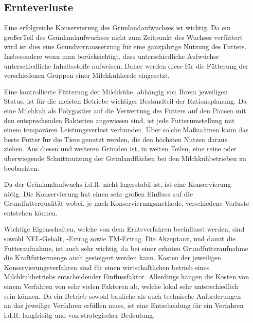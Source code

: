 \subsection{Ernteverluste}
\label{subsec:Lit:Ernte}

Eine erfolgreiche Konservierung des Grünlandaufwuchses ist wichtig.
Da ein großerTeil des Grünlandaufwuchses nicht zum Zeitpunkt des Wuchses verfüttert wird ist dies eine Grundvorraussetzung für eine ganzjährige Nutzung des Futters.
Insbesondere wenn man berücksichtigt, dass unterschiedliche Aufwüchse unterschiedliche Inhaltsstoffe aufweisen.
Daher werden diese für die Fütterung der verschiedenen Gruppen einer Milchkuhherde eingesetzt. 

Eine kontrollierte Fütterung der Milchkühe, abhängig von Ihrem jeweiligen Status, ist für die meisten Betriebe wichtiger Bestandteil der Rationsplanung. 
Da eine Milchkuh als Polygastier auf die Verwertung des Futters auf den Pansen mit den entsprechenden Bakterien angewiesen sind, ist jede Futterumstellung mit einem temporären Leistungsverlust verbunden. 
Über solche Maßnahmen kann das beste Futter für die Tiere genutzt werden, die den höchsten Nutzen daraus ziehen.
Aus diesen und weiteren Gründen ist, in weiten Teilen, eine reine oder überwiegende Schnittnutzung der Grünlandflächen bei den Milchkuhbetrieben zu beobachten.

Da der Grünlandaufwuchs i.d.R. nicht lagerstabil ist, ist eine Konservierung nötig.
Die Konservierung hat einen sehr großen Einfluss auf die Grundfutterqualität wobei, je nach Konservierungsmethode, verschiedene Verluste entstehen können. 

Wichtige Eigenschaften, welche von dem Ernteverfahren beeinflusst werden, sind sowohl \ac{NEL}-Gehalt, -Ertrag sowie \ac{TM}-Ertrag.
Die Akzeptanz, und damit die Futteraufnahme, ist auch sehr wichtig, da bei einer erhöten Grundfutteraufnahme die Kraftfuttermenge auch gesteigert werden kann.
Kosten der jeweiligen Konservierungsverfahren sind für einen wirtschaftlichen betrieb eines Milchkuhbetriebs entscheidender Einflussfaktor. 
Allerdings hängen die Kosten von einem Verfahren von sehr vielen Faktoren ab, welche lokal sehr unterschiedlich sein können.
Da ein Betrieb sowohl bauliche als auch technische Anforderungen an das jeweilige Verfahren erfüllen muss, ist eine Entscheidung für ein Verfahren i.d.R. langfrisitg und von strategischer Bedeutung. 

